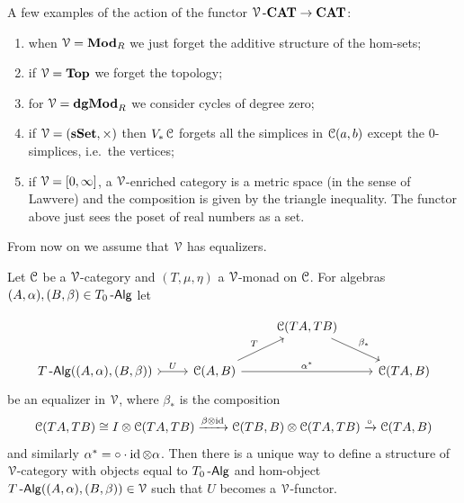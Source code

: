 \documentclass[a4paper,11pt,oneside,openany]{scrbook}
\begin{document}
\begin{exmp}
A few examples of the action of the functor $\operatorname{\mathcal{V}}\mbox{-}{\normalfont\textbf{CAT}}\to{\normalfont\textbf{CAT}}$:
\begin{enumerate}
    \item when $\operatorname{\mathcal{V}}={\normalfont\textbf{Mod}}_R$ we just forget the additive structure of the hom-sets;
    \item if $\operatorname{\mathcal{V}}={\normalfont\textbf{Top}}$ we forget the topology;
    \item for $\operatorname{\mathcal{V}}={\normalfont\textbf{dgMod}}_R$ we consider cycles of degree zero;
    \item if $\operatorname{\mathcal{V}}=({\normalfont\textbf{sSet}},\times)$ then $V_*\operatorname{\mathcal{C}}$ forgets all the simplices in $\operatorname{\mathcal{C}}(a,b)$ except the $0$-simplices, i.e.\ the vertices;
    \item if $\operatorname{\mathcal{V}}=[0,\infty]$, a $\operatorname{\mathcal{V}}$-enriched category is a metric space (in the sense of Lawvere) and the composition is given by the triangle inequality. The functor above just sees the poset of real numbers as a set.
\end{enumerate}
\end{exmp}
From now on we assume that $\operatorname{\mathcal{V}}$ has equalizers.
\begin{prop}
Let $\operatorname{\mathcal{C}}$ be a $\operatorname{\mathcal{V}}$-category and $(T,\mu,\eta)$ a $\operatorname{\mathcal{V}}$-monad on $\operatorname{\mathcal{C}}$. For algebras $(A,\alpha), (B,\beta)\in T_0\operatorname{-\mathsf{Alg}}$ let 
\end{prop}
\[
\begin{tikzcd}
&& \C(TA,TB) \arrow[rd, "\beta_*"] &  \\
T\Alg((A,\alpha),(B,\beta)) \arrow[r, tail, "U"] & \C(A,B) \arrow[rr, "\alpha^*"] \arrow[ru, "T"] &             & \C(TA,B)
\end{tikzcd}
\]
be an equalizer in $\operatorname{\mathcal{V}}$, where $\beta_*$ is the composition
$$\operatorname{\mathcal{C}}(TA,TB)\cong I\otimes\operatorname{\mathcal{C}}(TA,TB)\xrightarrow{\beta\otimes\operatorname{id}}\operatorname{\mathcal{C}}(TB,B)\otimes\operatorname{\mathcal{C}}(TA,TB)\xrightarrow{\circ}\operatorname{\mathcal{C}}(TA,B)$$
and similarly $\alpha^*=\circ \cdot \operatorname{id}\otimes\alpha$. Then there is a unique way to define a structure of $\operatorname{\mathcal{V}}$-category with objects equal to $T_0\operatorname{-\mathsf{Alg}}$ and hom-object $T\operatorname{-\mathsf{Alg}}((A,\alpha),(B,\beta))\in\operatorname{\mathcal{V}}$ such that $U$ becomes a $\operatorname{\mathcal{V}}$-functor.
\end{document}

